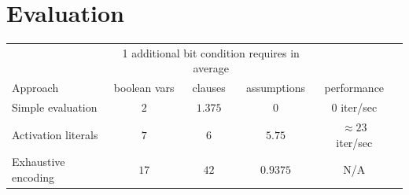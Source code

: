 \section{Evaluation}
\label{sec:results}
%
%
\begin{table}
 \begin{center}
  \begin{tabular}{lccccc}
                               & \multicolumn{3}{c}{1 additional bit condition requires in average} & \\
   Approach                    & boolean vars & clauses & assumptions   & performance \\
  \hline
   Simple evaluation           & $2$          & $1.375$ & $0$           & $0$ iter/sec \\
   Activation literals         & $7$          & $6$     & $5.75$        & $\approx23$ iter/sec \\
   Exhaustive encoding         & $17$         & $42$    & $0.9375$      & N/A \\

\end{tabular}
\end{center}
\end{table}
